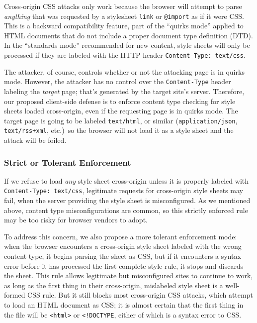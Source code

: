 \documentclass{acm_proc_article-sp}
\begin{document}
Cross-origin CSS attacks only work because the browser will attempt to
parse \emph{anything} that was requested by a stylesheet \verb|link|
or \verb|@import| as if it were CSS.  This is a backward compatibility
feature, part of the “quirks mode” applied to HTML documents that do
not include a proper document type definition (DTD).  In the
“standards mode” recommended for new content, style sheets will only
be processed if they are labeled with the HTTP header
\verb|Content-Type: text/css|.

The attacker, of course, controls whether or not the attacking page is
in quirks mode.  However, the attacker has no control over the
\texttt{Content-Type} header labeling the \emph{target} page; that's
generated by the target site's server.  Therefore, our proposed
client-side defense is to enforce content type checking for
style sheets loaded cross-origin, even if the requesting page is in
quirks mode.  The target page is going to be labeled \verb|text/html|,
or similar (\verb|application/json|, \verb|text/rss+xml|, etc.)\ so
the browser will not load it as a style sheet and the attack will be
foiled.

\subsubsection{Strict or Tolerant Enforcement} \label{sec:enfmodes}
If we refuse to load \emph{any} style sheet cross-origin unless it is
properly labeled with \verb|Content-Type: text/css|, legitimate
requests for cross-origin style sheets may fail, when the server
providing the style sheet is misconfigured.  As we mentioned above,
content type misconfigurations are common, so this strictly
enforced rule may be too risky for browser vendors to adopt.

To address this concern, we also propose a more tolerant enforcement
mode: when the browser encounters a cross-origin style sheet labeled
with the wrong content type, it begins parsing the sheet as
CSS, but if it encounters a syntax error before it has processed the
first complete style rule, it stops and discards the sheet.  This rule
allows legitimate but misconfigured sites to continue to work, as long
as the first thing in their cross-origin, mislabeled style sheet is a
well-formed CSS rule.  But it still blocks most cross-origin CSS
attacks, which attempt to load an HTML document as CSS; it is almost
certain that the first thing in the file will be \verb|<html>| or
\verb|<!DOCTYPE|, either of which is a syntax error to CSS.
\end{document}
